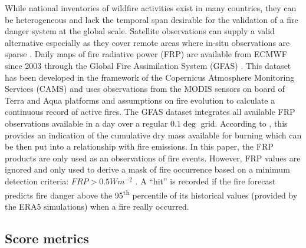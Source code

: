\documentclass[, manuscript]{copernicus}
\begin{document}
While national inventories of wildfire activities exist in many
countries, they can be heterogeneous and lack the temporal span
desirable for the validation of a fire danger system at the global
scale. Satellite observations can supply a valid alternative especially
as they cover remote areas where in-situ observations are sparse
\citep{flannigan:86,giglio:03,schroeder:08}. Daily maps of fire
radiative power (FRP) \citep{kaufman:03,wooster:05} are available from
ECMWF since 2003 through the Global Fire Assimilation System (GFAS)
\citep{kaiser:2012,digiuseppe:17,digiuseppe:18}. This dataset has been
developed in the framework of the Copernicus Atmosphere Monitoring
Services (CAMS) and uses observations from the MODIS sensors on board of
Terra and Aqua platforms and assumptions on fire evolution to calculate
a continuous record of active fires. The GFAS dataset integrates all
available FRP observations available in a day over a regular \(0.1\deg\)
grid. According to \citet{wooster:05}, this provides an indication of
the cumulative dry mass available for burning which can be then put into
a relationship with fire emissions. In this paper, the FRP products are
only used as an observations of fire events. However, FRP values are
ignored and only used to derive a mask of fire occurrence based on a
minimum detection criteria: \(FRP> 0.5 Wm^{-2}\) \citep{kaiser:2012}. A
``hit'' is recorded if the fire forecast predicts fire danger above the
95\textsuperscript{th} percentile of its historical values (provided by
the ERA5 simulations) when a fire really occurred.

\subsection{Score metrics}
\end{document}
